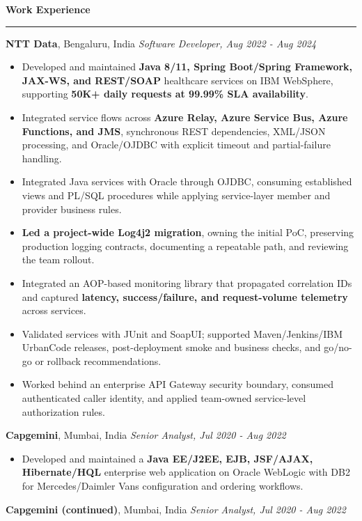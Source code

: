 \documentclass[11pt,letterpaper]{article}
\newcommand{\ressection}[1]{\Needspace{6\baselineskip}\vspace{8pt}\par\textbf{#1}\par\vspace{2pt}\hrule\vspace{5pt}}
\begin{document}
\ressection{Work Experience}
\textbf{NTT Data}, Bengaluru, India \hfill \textit{Software Developer, Aug 2022 - Aug 2024}
\begin{itemize}
  \item Developed and maintained \textbf{Java 8/11, Spring Boot/Spring Framework, JAX-WS, and REST/SOAP} healthcare services on IBM WebSphere, supporting \textbf{50K+ daily requests at 99.99\% SLA availability}.
  \item Integrated service flows across \textbf{Azure Relay, Azure Service Bus, Azure Functions, and JMS}, synchronous REST dependencies, XML/JSON processing, and Oracle/OJDBC with explicit timeout and partial-failure handling.
  \item Integrated Java services with Oracle through OJDBC, consuming established views and PL/SQL procedures while applying service-layer member and provider business rules.
  \item \textbf{Led a project-wide Log4j2 migration}, owning the initial PoC, preserving production logging contracts, documenting a repeatable path, and reviewing the team rollout.
  \item Integrated an AOP-based monitoring library that propagated correlation IDs and captured \textbf{latency, success/failure, and request-volume telemetry} across services.
  \item Validated services with JUnit and SoapUI; supported Maven/Jenkins/IBM UrbanCode releases, post-deployment smoke and business checks, and go/no-go or rollback recommendations.
  \item Worked behind an enterprise API Gateway security boundary, consumed authenticated caller identity, and applied team-owned service-level authorization rules.
\end{itemize}
\textbf{Capgemini}, Mumbai, India \hfill \textit{Senior Analyst, Jul 2020 - Aug 2022}
\begin{itemize}
  \item Developed and maintained a \textbf{Java EE/J2EE, EJB, JSF/AJAX, Hibernate/HQL} enterprise web application on Oracle WebLogic with DB2 for Mercedes/Daimler Vans configuration and ordering workflows.
\end{itemize}
\newpage
\textbf{Capgemini (continued)}, Mumbai, India \hfill \textit{Senior Analyst, Jul 2020 - Aug 2022}
\end{document}
